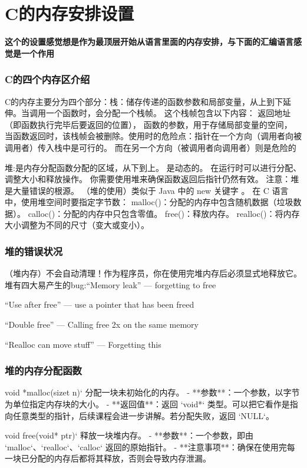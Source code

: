 \documentclass{ctexart}
\begin{document}
\section{C的内存安排设置}
\textbf{这个的设置感觉想是作为最顶层开始从语言里面的内存安排，与下面的汇编语言感觉是一个作用}\par
\subsubsection{C的四个内存区介绍}
C的内存主要分为四个部分：栈：储存传递的函数参数和局部变量，从上到下延伸。当调用一个函数时，会分配一个栈帧。
这个栈帧包含以下内容：
返回地址（即函数执行完毕后要返回的位置），
函数的参数，用于存储局部变量的空间，
当函数返回时，该栈帧会被删除。使用时的危险点：指针在一个方向（调用者向被调用者）传入栈中是可行的。
而在另一个方向（被调用者向调用者）则是危险的\par
堆:是内存分配函数分配的区域，从下到上。
是动态的。
在运行时可以进行分配、调整大小和释放操作。
你需要使用堆来确保函数返回后指针仍然有效。
注意：堆是大量错误的根源。
（堆的使用）类似于 Java 中的 new 关键字 。
在 C 语言中，使用堆空间时要指定字节数：
malloc()：分配的内存中包含随机数据（垃圾数据）。
calloc()：分配的内存中只包含零值。
free()：释放内存。
realloc()：将内存大小调整为不同的尺寸（变大或变小）。
\subsubsection{堆的错误状况}
（堆内存）不会自动清理！作为程序员，你在使用完堆内存后必须显式地释放它。堆有四大易产生的bug:“Memory leak” — forgetting to free\par
“Use after free” — use a pointer that has been freed\par
“Double free” — Calling free 2x on the same memory\par
“Realloc can move stuff” — Forgetting this\par
\subsubsection{堆的内存分配函数}
void *malloc(sizet n)`
分配一块未初始化的内存。
- **参数**：一个参数，以字节为单位指定内存块的大小。
- **返回值**：返回 `void*` 类型。可以把它看作是指向任意类型的指针，后续课程会进一步讲解。若分配失败，返回 `NULL`。\par

void free(void* ptr)`
释放一块堆内存。
- **参数**：一个参数，即由 `malloc`、`realloc`、`calloc` 返回的原始指针。
- **注意事项**：确保在使用完每一块已分配的内存后都将其释放，否则会导致内存泄漏。\par
\end{document}
